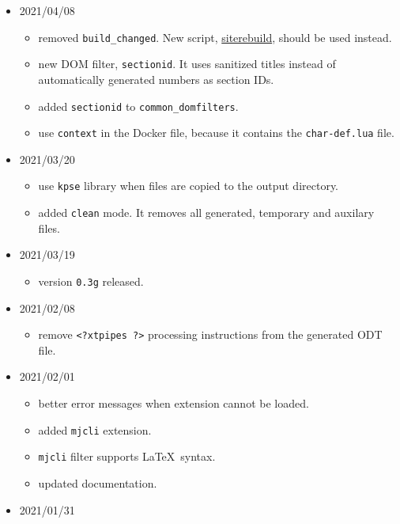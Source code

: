 \begin{itemize}
  \begin{itemize}
  \tightlist
  \item
    added function \texttt{mkutils.isModuleAvailable}. It checks if Lua
    library is available.
  \item
    check for \texttt{char-def} library in \texttt{sectionid} DOM
    filter.
  \end{itemize}
\item
  2021/04/08

  \begin{itemize}
  \tightlist
  \item
    removed \texttt{build\_changed}. New script,
    \href{https://github.com/michal-h21/siterebuild}{siterebuild},
    should be used instead.
  \item
    new DOM filter, \texttt{sectionid}. It uses sanitized titles instead
    of automatically generated numbers as section IDs.
  \item
    added \texttt{sectionid} to \texttt{common\_domfilters}.
  \item
    use \texttt{context} in the Docker file, because it contains the
    \texttt{char-def.lua} file.
  \end{itemize}
\item
  2021/03/20

  \begin{itemize}
  \tightlist
  \item
    use \texttt{kpse} library when files are copied to the output
    directory.
  \item
    added \texttt{clean} mode. It removes all generated, temporary and
    auxilary files.
  \end{itemize}
\item
  2021/03/19

  \begin{itemize}
  \tightlist
  \item
    version \texttt{0.3g} released.
  \end{itemize}
\item
  2021/02/08

  \begin{itemize}
  \tightlist
  \item
    remove \texttt{\textless{}?xtpipes\ ?\textgreater{}} processing
    instructions from the generated ODT file.
  \end{itemize}
\item
  2021/02/01

  \begin{itemize}
  \tightlist
  \item
    better error messages when extension cannot be loaded.
  \item
    added \texttt{mjcli} extension.
  \item
    \texttt{mjcli} filter supports \LaTeX~syntax.
  \item
    updated documentation.
  \end{itemize}
\item
  2021/01/31


\end{itemize}
